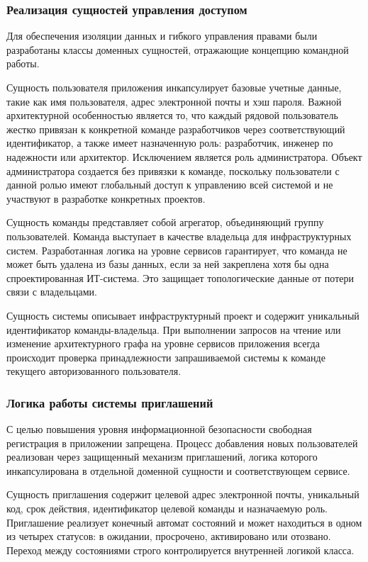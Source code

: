 \subsubsection{Реализация сущностей управления доступом}

Для обеспечения изоляции данных и гибкого управления правами были разработаны 
классы доменных сущностей, отражающие концепцию командной работы.

Сущность пользователя приложения инкапсулирует базовые учетные данные, такие 
как имя пользователя, адрес электронной почты и хэш пароля. 
Важной архитектурной особенностью является то, что каждый рядовой пользователь 
жестко привязан к конкретной команде разработчиков через соответствующий 
идентификатор, а также имеет назначенную роль: разработчик, инженер 
по надежности или архитектор. Исключением является роль администратора. Объект 
администратора создается без привязки к команде, поскольку пользователи с данной 
ролью имеют глобальный доступ к управлению всей системой и не участвуют в разработке 
конкретных проектов.

Сущность команды представляет собой агрегатор, объединяющий группу пользователей. 
Команда выступает в качестве владельца для инфраструктурных систем. Разработанная 
логика на уровне сервисов гарантирует, что команда не может быть удалена из базы 
данных, если за ней закреплена хотя бы одна спроектированная ИТ-система. Это 
защищает топологические данные от потери связи с владельцами.

Сущность системы описывает инфраструктурный проект и содержит уникальный 
идентификатор команды-владельца. При выполнении запросов на чтение или изменение 
архитектурного графа на уровне сервисов приложения всегда происходит проверка 
принадлежности запрашиваемой системы к команде текущего авторизованного пользователя.

\subsubsection{Логика работы системы приглашений}

С целью повышения уровня информационной безопасности свободная регистрация в 
приложении запрещена. Процесс добавления новых пользователей реализован через 
защищенный механизм приглашений, логика которого инкапсулирована в отдельной 
доменной сущности и соответствующем сервисе.

Сущность приглашения содержит целевой адрес электронной почты, 
уникальный код, срок действия, идентификатор целевой команды и 
назначаемую роль. Приглашение реализует конечный автомат состояний и может 
находиться в одном из четырех статусов: в ожидании, просрочено, активировано 
или отозвано. Переход между состояниями строго контролируется внутренней логикой 
класса.

